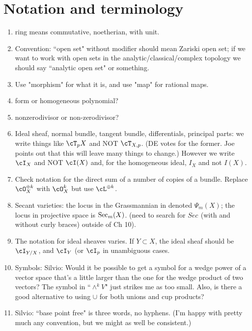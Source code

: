 \documentclass[12pt, leqno]{book}
\begin{document}
\section{Notation and terminology}

\begin{enumerate}
\item ring means commutative, noetherian, with unit.
\item Convention: ``open set" without modifier should mean Zariski open set; if we want to work with open sets in the analytic/classical/complex topology we should say ``analytic open set" or something.

\item Use "morphism" for what it is, and use "map" for rational maps.

 \item form or homogeneous polynomial?
 \item nonzerodivisor or non-zerodivisor?

\item Ideal sheaf, normal bundle, tangent bundle, differentials, principal parts: we write things like 
$\cT_{p}X$ and NOT $\cT_{X,p}$.  (DE votes for the former. Joe points out that
this will leave many things to change.) However  we write $\cI_{X}$ and NOT $\cI(X)$ and, for the homogeneous
ideal, $I_{X}$ and not $I(X)$.

\item Check notation for the direct sum of a number of copies of a bundle. Replace $\cO_{X}^{\oplus k}$ with $\cO_{X}^{k}$ but use 
$\cL^{\oplus k}$.

\item Secant varieties: the locus in the Grassmannian in denoted $\Psi_m(X)$; the locus in projective space is $\Sec_m(X)$. (need to search for $Sec_{}$ (with and without curly braces) outside of Ch 10).

\item The notation for ideal sheaves varies. If $Y \subset X$,  the ideal sheaf should be $\cI_{Y/X}$, and $\cI_{Y}$ (or $\cI_{p}$ in unambiguous cases.

\item Symbols: Silvio: Would it be possible to get a symbol for a wedge power of a vector space that's a little larger than the one for the wedge product of two vectors? The symbol in ``$\wedge^k V$" just strikes me as too small. Also, is there a good alternative to using $\cup$ for both unions and cup products?

\item Silvio: ``base point free" is three words, no hyphens. (I'm happy with pretty much any convention, but we might as well be consistent.)



\end{enumerate}
\end{document}
